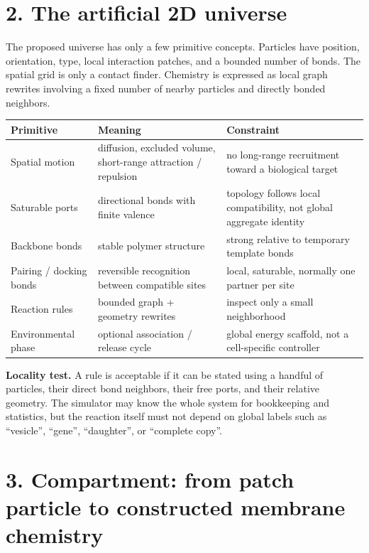 \documentclass[10pt,a4paper]{article}
\begin{document}
\section{2. The artificial 2D universe}

The proposed universe has only a few primitive concepts. Particles have position, orientation, type, local interaction patches, and a bounded number of bonds. The spatial grid is only a contact finder. Chemistry is expressed as local graph rewrites involving a fixed number of nearby particles and directly bonded neighbors.

\begin{tabularx}{\textwidth}{@{}p{}X X@{}}
\toprule
\textbf{Primitive} & \textbf{Meaning} & \textbf{Constraint} \\
\midrule
Spatial motion & diffusion, excluded volume, short-range attraction / repulsion & no long-range recruitment toward a biological target \\
Saturable ports & directional bonds with finite valence & topology follows local compatibility, not global aggregate identity \\
Backbone bonds & stable polymer structure & strong relative to temporary template bonds \\
Pairing / docking bonds & reversible recognition between compatible sites & local, saturable, normally one partner per site \\
Reaction rules & bounded graph + geometry rewrites & inspect only a small neighborhood \\
Environmental phase & optional association / release cycle & global energy scaffold, not a cell-specific controller \\
\bottomrule
\end{tabularx}

\begin{principle}
\textbf{Locality test.} A rule is acceptable if it can be stated using a handful of particles, their direct bond neighbors, their free ports, and their relative geometry. The simulator may know the whole system for bookkeeping and statistics, but the reaction itself must not depend on global labels such as ``vesicle'', ``gene'', ``daughter'', or ``complete copy''.
\end{principle}

\section{3. Compartment: from patch particle to constructed membrane chemistry}
\end{document}
